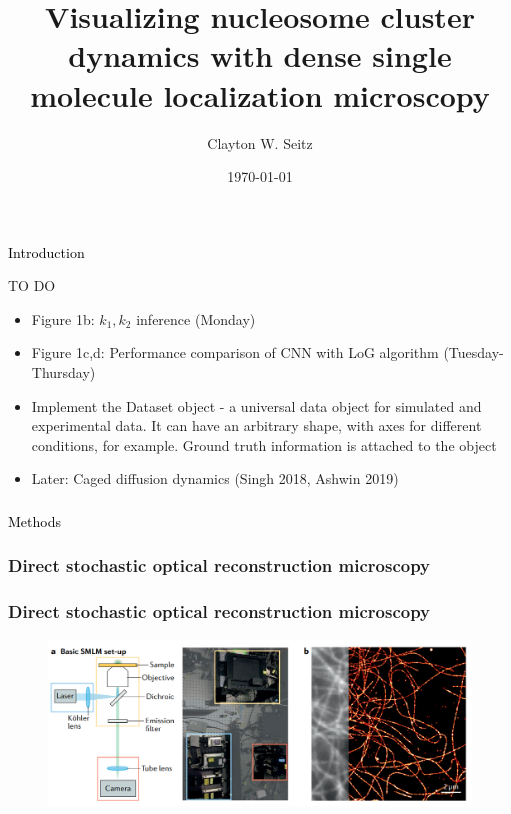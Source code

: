 \documentclass{beamer}					%
\title{Visualizing nucleosome cluster dynamics with dense single molecule localization microscopy}	%
\author{Clayton W. Seitz}								%
\date{\today}									%
\begin{document}
\begin{frame}
  \titlepage
\end{frame}


%


\begin{frame}
\frametitle{}
\centering
\Large \textcolor{black}{Introduction}
\end{frame}


\begin{frame}{TO DO}
\begin{itemize}
\item Figure 1b: $k_{1},k_{2}$ inference (Monday)
\item Figure 1c,d: Performance comparison of CNN with LoG algorithm (Tuesday-Thursday)
\item Implement the Dataset object - a universal data object for simulated and experimental data. It can have an arbitrary shape, with axes for different conditions, for example. Ground truth information is attached to the object
\item Later: Caged diffusion dynamics (Singh 2018, Ashwin 2019)
\end{itemize}
\end{frame}


\begin{frame}
\frametitle{}
\centering
\Large \textcolor{black}{Methods}
\end{frame}



\begin{frame}
\frametitle{Direct stochastic optical reconstruction microscopy}

\end{frame}

\begin{frame}
\frametitle{Direct stochastic optical reconstruction microscopy}

\begin{figure}
\includegraphics[width=\textwidth]{Setup.png}
\end{figure}
  
\end{frame}
\end{document}
